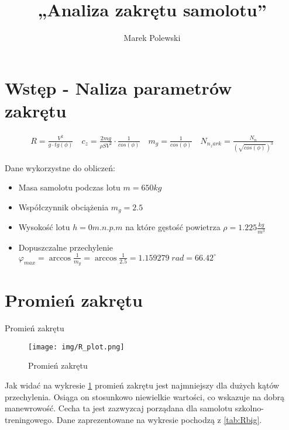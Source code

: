 \documentclass{sprawozdanie}
\title{„Analiza zakrętu samolotu”}
\author{Marek Polewski}
\begin{document}
\maketitle




\FloatBarrier
\setcounter{page}{1}

\section{Wstęp - Naliza parametrów zakrętu}

\begin{align*}
    R = \frac{V^2}{g\cdot tg(\phi)} \quad c_z = \frac{2mg}{\rho S V^2} \cdot \frac{1}{cos (\phi)} \quad m_g = \frac{1}{cos(\phi)} \quad N_{n_zark} = \frac{N_n}{(\sqrt{cos(\phi)})^3}
\end{align*}

Dane wykorzystne do obliczeń:
\begin{itemize}
    \item Masa samolotu podczas lotu $m = 650 kg$
    \item Współczynnik obciążenia $m_g = 2.5$
    \item Wysokość lotu $h = 0 m.n.p.m$ na które gęstość powietrza $\rho = 1.225 \frac{kg}{m^3}$
    \item Dopuszczalne przechylenie $\varphi_{max} = \arccos{\frac{1}{m_g}} = \arccos{\frac{1}{2.5}} = 1.159279 \; rad = 66.42^{\circ} $
\end{itemize}
\section{Promień zakrętu}


\begin{table}[H]
    \centering
    \resizebox{0.99\width}{!}{}
    \caption{Promień zakrętu}
    \label{tab:R}
\end{table}

\begin{figure}[H]
    \centering
    \texttt{[image: img/R\_plot.png]}
    \caption{Promień zakrętu}
    \label{fig:R}
\end{figure}

Jak widać na wykresie \ref{fig:R} promień zakrętu jest najmniejszy dla dużych kątów przechylenia. Osiąga on stosunkowo niewielkie wartości, co wskazuje na dobrą manewrowość. Cecha ta jest zazwyzcaj porządana dla samolotu szkolno-treningowego. Dane zaprezentowane na wykresie pochodzą z \cref{tab:Rbig}.
\end{document}
